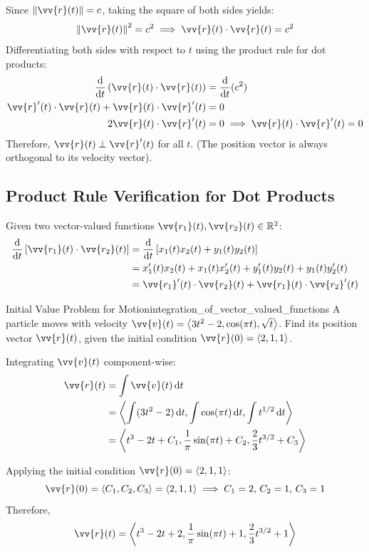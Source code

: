 \begin{sol}
Since $\norm{\vv{r}(t)} = c$, taking the square of both sides yields:
\[
\norm{\vv{r}(t)}^2 = c^2 \implies \vv{r}(t) \cdot \vv{r}(t) = c^2
\]
Differentiating both sides with respect to $t$ using the product rule for dot products:
\begin{align*}
\frac{\dd{}}{\dd{t}}\left(\vv{r}(t) \cdot \vv{r}(t)\right) &= \frac{\dd{}}{\dd{t}}(c^2) \\
\vv{r}'(t) \cdot \vv{r}(t) + \vv{r}(t) \cdot \vv{r}'(t) &= 0 \\
2\vv{r}(t) \cdot \vv{r}'(t) &= 0 \implies \vv{r}(t) \cdot \vv{r}'(t) = 0
\end{align*}
Therefore, $\vv{r}(t) \perp \vv{r}'(t)$ for all $t$. (The position vector is always orthogonal to its velocity vector).
\end{sol}

\subsection*{Product Rule Verification for Dot Products}
Given two vector-valued functions $\vv{r_1}(t), \vv{r_2}(t) \in \mathbb{R}^2$:
\begin{align*}
\frac{\dd{}}{\dd{t}}\left[\vv{r_1}(t) \cdot \vv{r_2}(t)\right] &= \frac{\dd{}}{\dd{t}}\left[x_1(t)x_2(t) + y_1(t)y_2(t)\right] \\
&= x_1'(t)x_2(t) + x_1(t)x_2'(t) + y_1'(t)y_2(t) + y_1(t)y_2'(t) \\
&= \vv{r_1}'(t) \cdot \vv{r_2}(t) + \vv{r_1}(t) \cdot \vv{r_2}'(t)
\end{align*}

\begin{problem}{Initial Value Problem for Motion}{integration_of_vector_valued_functions}
A particle moves with velocity $\vv{v}(t) = \ang{3t^2 - 2, \cos (\pi t), \sqrt{t}}$. Find its position vector $\vv{r}(t)$, given the initial condition $\vv{r}(0) = \ang{2, 1, 1}$.
\end{problem}

\begin{sol}
Integrating $\vv{v}(t)$ component-wise:
\begin{align*}
\vv{r}(t) &= \int \vv{v}(t) \, \dd{t} \\
&= \ang{\int (3t^2 - 2) \, \dd{t}, \int \cos (\pi t) \, \dd{t}, \int t^{1/2} \, \dd{t}} \\
&= \ang{t^3 - 2t + C_1, \frac{1}{\pi} \sin (\pi t) + C_2, \frac{2}{3} t^{3/2} + C_3}
\end{align*}

Applying the initial condition $\vv{r}(0) = \ang{2, 1, 1}$:
\[
\vv{r}(0) = \ang{C_1, C_2, C_3} = \ang{2, 1, 1} \implies C_1 = 2, \, C_2 = 1, \, C_3 = 1
\]
Therefore,
\[
\vv{r}(t) = \ang{t^3 - 2t + 2, \frac{1}{\pi} \sin (\pi t) + 1, \frac{2}{3} t^{3/2} + 1}
\]
\end{sol}

